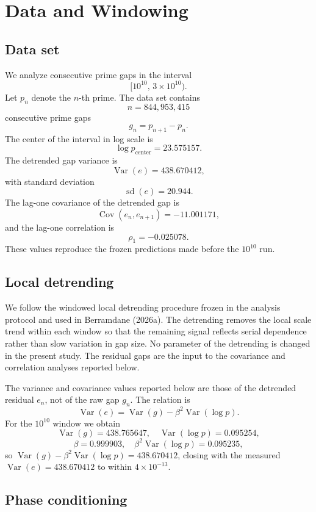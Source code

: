 \section{Data and Windowing}

\subsection{Data set}

We analyze consecutive prime gaps in the interval
\[
[10^{10},\,3\times 10^{10}).
\]
Let $p_n$ denote the $n$-th prime. The data set contains
\[
n = 844{,}953{,}415
\]
consecutive prime gaps
\[
g_n = p_{n+1}-p_n.
\]
The center of the interval in log scale is
\[
\log p_{\text{center}} = 23.575157.
\]
The detrended gap variance is
\[
\operatorname{Var}(e) = 438.670412,
\]
with standard deviation
\[
\operatorname{sd}(e) = 20.944.
\]
The lag-one covariance of the detrended gap is
\[
\operatorname{Cov}(e_n,e_{n+1}) = -11.001171,
\]
and the lag-one correlation is
\[
\rho_1 = -0.025078.
\]
These values reproduce the frozen predictions made before the $10^{10}$ run.

\subsection{Local detrending}

We follow the windowed local detrending procedure frozen in the analysis protocol and used in Berramdane (2026a). The detrending removes the local scale trend within each window so that the remaining signal reflects serial dependence rather than slow variation in gap size. No parameter of the detrending is changed in the present study. The residual gaps are the input to the covariance and correlation analyses reported below.

The variance and covariance values reported below are those of the detrended residual $e_n$, not of the raw gap $g_n$. The relation is
\[
\operatorname{Var}(e) = \operatorname{Var}(g) - \beta^2 \operatorname{Var}(\log p).
\]
For the $10^{10}$ window we obtain
\[
\operatorname{Var}(g) = 438.765647,\quad
\operatorname{Var}(\log p) = 0.095254,
\]
\[
\beta = 0.999903,\quad
\beta^2 \operatorname{Var}(\log p) = 0.095235,
\]
so $\operatorname{Var}(g) - \beta^2 \operatorname{Var}(\log p) = 438.670412$, closing with the measured $\operatorname{Var}(e) = 438.670412$ to within $4 \times 10^{-13}$.

\subsection{Phase conditioning}

